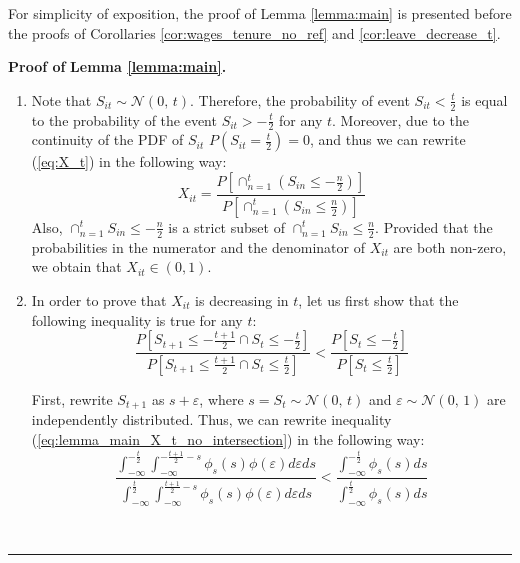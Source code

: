 \documentclass[12pt]{article}
\newenvironment{proof}[1][Proof of]{\noindent\textbf{#1} }{\ \rule{0.5em}{0.5em}}
\begin{document}
For simplicity of exposition, the proof of Lemma \ref{lemma:main} is presented before the proofs of Corollaries \ref{cor:wages_tenure_no_ref} and \ref{cor:leave_decrease_t}.

\begin{proof}
\textbf{Lemma \ref{lemma:main}.} 
\begin{enumerate}[label={\roman*})]
\item Note that $S_{it} \sim  \mathcal{N}(0,\,t)$. Therefore, the probability of event $S_{it} < \frac{t}{2}$ is equal to the probability of the event $S_{it}> -\frac{t}{2}$ for any $t$. Moreover, due to the continuity of the PDF of $S_{it}$ $P(S_{it} = \frac{t}{2}) = 0$, and thus we can rewrite (\ref{eq:X_t}) in the following way:
\begin{equation}\label{eq:lemma_main_X_t_standard}
X_{it} = \frac{P\left[ \cap_{n=1}^{t}(S_{in}\leq -\frac{n}{2}) \right] }
{P\left[ \cap_{n=1}^{t}(S_{in}\leq \frac{n}{2}) \right] }
\end{equation}
Also, $\cap_{n=1}^{t}S_{in}\leq -\frac{n}{2}$ is a strict subset of $\cap_{n=1}^{t}S_{in}\leq \frac{n}{2}$. Provided that the probabilities in  the numerator and the denominator of $X_{it}$ are both non-zero, we obtain that $X_{it} \in \left(0,1\right)$.
\item In order to prove that $X_{it}$ is decreasing in $t$, let us first show that the following inequality is true for any $t$:
\begin{equation}\label{eq:lemma_main_X_t_no_intersection}
\frac{P\left[S_{t+1}\leq-\frac{t+1}{2} \cap S_{t}\leq-\frac{t}{2} \right]}
{P\left[S_{t+1}\leq \frac{t+1}{2} \cap S_{t}\leq \frac{t}{2} \right]} 
< \frac{P\left[S_{t}\leq-\frac{t}{2} \right]}
{P\left[S_{t}\leq \frac{t}{2} \right]}
\end{equation}

First, rewrite $S_{t+1}$ as $s+\varepsilon$, where $s = S_t \sim  \mathcal{N}(0,\,t)$ and $\varepsilon \sim  \mathcal{N}(0,\,1)$ are independently distributed. Thus, we can rewrite inequality (\ref{eq:lemma_main_X_t_no_intersection}) in the following way:
\begin{equation}\label{eq:main_lemma_rhs_X_t_no_intersection}
\frac{\int_{-\infty}^{-\frac{t}{2}}\int_{-\infty}^{-\frac{t+1}{2}-s}\phi_{s}(s)\phi(\varepsilon)d\varepsilon ds}
{\int_{-\infty}^{\frac{t}{2}}\int_{-\infty}^{\frac{t+1}{2}-s}\phi_{s}(s)\phi(\varepsilon)d\varepsilon ds}
<
\frac{\int_{-\infty}^{-\frac{t}{2}}\phi_{s}(s)ds}
{\int_{-\infty}^{\frac{t}{2}}\phi_{s}(s)ds}
\end{equation}


\end{enumerate}
\end{proof}
\end{document}
